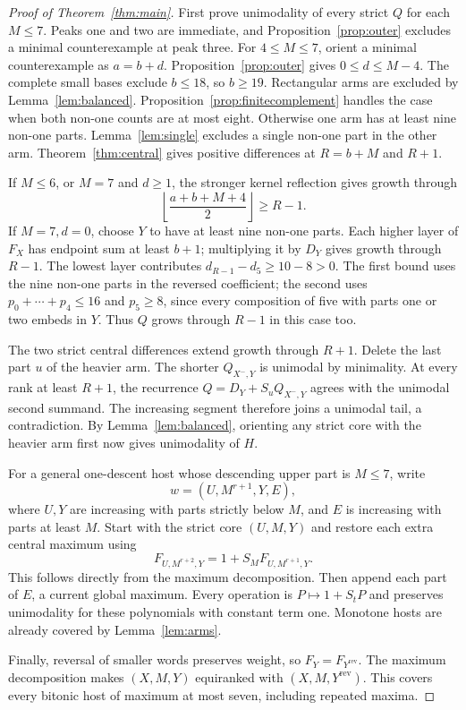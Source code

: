 \begin{proof}[Proof of Theorem~\ref{thm:main}]
First prove unimodality of every strict $Q$ for each $M\le7$. Peaks one and two are immediate, and Proposition~\ref{prop:outer} excludes a minimal counterexample at peak three. For $4\le M\le7$, orient a minimal counterexample as $a=b+d$. Proposition~\ref{prop:outer} gives $0\le d\le M-4$. The complete small bases exclude $b\le18$, so $b\ge19$. Rectangular arms are excluded by Lemma~\ref{lem:balanced}. Proposition~\ref{prop:finitecomplement} handles the case when both non-one counts are at most eight. Otherwise one arm has at least nine non-one parts. Lemma~\ref{lem:single} excludes a single non-one part in the other arm. Theorem~\ref{thm:central} gives positive differences at $R=b+M$ and $R+1$.

If $M\le6$, or $M=7$ and $d\ge1$, the stronger kernel reflection gives growth through
\[
 \left\lfloor\frac{a+b+M+4}{2}\right\rfloor\ge R-1.
\]
If $M=7,d=0$, choose $Y$ to have at least nine non-one parts. Each higher layer of $F_X$ has endpoint sum at least $b+1$; multiplying it by $D_Y$ gives growth through $R-1$. The lowest layer contributes $d_{R-1}-d_5\ge10-8>0$. The first bound uses the nine non-one parts in the reversed coefficient; the second uses $p_0+\cdots+p_4\le16$ and $p_5\ge8$, since every composition of five with parts one or two embeds in $Y$. Thus $Q$ grows through $R-1$ in this case too.

The two strict central differences extend growth through $R+1$. Delete the last part $u$ of the heavier arm. The shorter $Q_{X^-,Y}$ is unimodal by minimality. At every rank at least $R+1$, the recurrence $Q=D_Y+S_uQ_{X^-,Y}$ agrees with the unimodal second summand. The increasing segment therefore joins a unimodal tail, a contradiction. By Lemma~\ref{lem:balanced}, orienting any strict core with the heavier arm first now gives unimodality of $H$.

For a general one-descent host whose descending upper part is $M\le7$, write
\[
 w=(U,M^{r+1},Y,E),
\]
where $U,Y$ are increasing with parts strictly below $M$, and $E$ is increasing with parts at least $M$. Start with the strict core $(U,M,Y)$ and restore each extra central maximum using
\[
 F_{U,M^{r+2},Y}=1+S_MF_{U,M^{r+1},Y}.
\]
This follows directly from the maximum decomposition. Then append each part of $E$, a current global maximum. Every operation is $P\mapsto1+S_tP$ and preserves unimodality for these polynomials with constant term one. Monotone hosts are already covered by Lemma~\ref{lem:arms}.

Finally, reversal of smaller words preserves weight, so $F_Y=F_{Y^{\mathrm{rev}}}$. The maximum decomposition makes $(X,M,Y)$ equiranked with $(X,M,Y^{\mathrm{rev}})$. This covers every bitonic host of maximum at most seven, including repeated maxima.
\end{proof}

